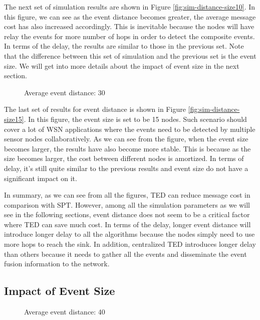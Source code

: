 The next set of simulation results are shown in Figure \ref{fig:sim-distance-size10}. In this figure, we can see as the event distance becomes greater, the average message cost has also increased accordingly. This is inevitable because the nodes will have relay the events for more number of hops in order to detect the composite events. In terms of the delay, the results are similar to those in the previous set. Note that the difference between this set of simulation and the previous set is the event size. We will get into more details about the impact of event size in the next section. 

\begin{figure}
\centering
{}
\caption{Average event distance: 30}
\label{fig:sim-size-distance30}
\end{figure}

The last set of results for event distance is shown in Figure \ref{fig:sim-distance-size15}. In this figure, the event size is set to be 15 nodes. Such scenario should cover a lot of WSN applications where the events need to be detected by multiple sensor nodes collaboratively. As we can see from the figure, when the event size becomes larger, the results have also become more stable. This is because as the size becomes larger, the cost between different nodes is amortized. In terms of delay, it's still quite similar to the previous results and event size do not have a significant impact on it.

In summary, as we can see from all the figures, TED can reduce message cost in comparison with SPT. However, among all the simulation parameters as we will see in the following sections, event distance does not seem to be a critical factor where TED can save much cost. In terms of the delay, longer event distance will introduce longer delay to all the algorithms because the nodes simply need to use more hops to reach the sink. In addition, centralized TED introduces longer delay than others because it needs to gather all the events and disseminate the event fusion information to the network.

\subsection{Impact of Event Size}
\begin{figure}
\centering
{}
\caption{Average event distance: 40}
\label{fig:sim-size-distance40}
\end{figure}

